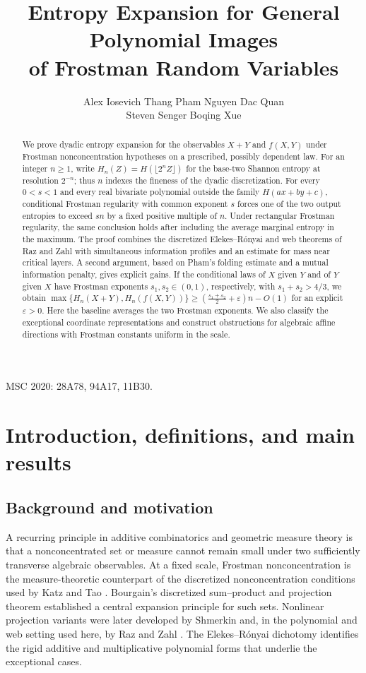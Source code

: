 \documentclass[11pt]{article}
\title{Entropy Expansion for General Polynomial Images\\
of Frostman Random Variables}
\author{Alex Iosevich \quad Thang Pham \quad Nguyen Dac Quan\\[0.5ex]
Steven Senger \quad Boqing Xue}
\date{}
\begin{document}
\maketitle

\begin{abstract}
We prove dyadic entropy expansion for the observables \(X+Y\) and
\(f(X,Y)\) under Frostman nonconcentration hypotheses on a prescribed,
possibly dependent law.  For an integer \(n\ge1\), write
\(H_n(Z)=H(\lfloor 2^nZ\rfloor)\) for the base-two Shannon entropy
at resolution \(2^{-n}\); thus \(n\) indexes the fineness of the
dyadic discretization.  For every \(0<s<1\) and every real bivariate
polynomial outside the family \(H(ax+by+c)\), conditional Frostman
regularity with common exponent \(s\) forces one of the two output entropies to exceed \(sn\) by
a fixed positive multiple of \(n\).  Under rectangular Frostman
regularity, the same conclusion holds after including the average
marginal entropy in the maximum.  The proof combines the discretized
Elekes--R\'onyai and web theorems of Raz and Zahl with simultaneous
information profiles and an estimate for mass near critical layers.
A second argument, based on Pham's folding estimate and a mutual
information penalty, gives explicit gains.  If the conditional laws
of \(X\) given \(Y\) and of \(Y\) given \(X\) have Frostman
exponents \(s_1,s_2\in(0,1)\), respectively, with
\(s_1+s_2>4/3\), we obtain
\(\max\{H_n(X+Y),H_n(f(X,Y))\}\ge
(\frac{s_1+s_2}{2}+\varepsilon)n-O(1)\)
for an explicit \(\varepsilon>0\).  Here the baseline averages the
two Frostman exponents.  We also classify the exceptional
coordinate representations and construct obstructions for algebraic
affine directions with Frostman constants uniform in the scale.
\end{abstract}

\noindent MSC 2020: 28A78, 94A17, 11B30.

\tableofcontents

\section{Introduction, definitions, and main results}
\label{sec:main}

\subsection{Background and motivation}

A recurring principle in additive combinatorics and geometric measure
theory is that a nonconcentrated set or measure cannot remain small
under two sufficiently transverse algebraic observables.  At a fixed
scale, Frostman nonconcentration is the measure-theoretic counterpart
of the discretized nonconcentration conditions used by Katz and Tao
\cite{KatzTao}.  Bourgain's discretized sum--product and projection
theorem \cite{BourgainProjection} established a central expansion
principle for such sets.  Nonlinear projection variants were later
developed by Shmerkin \cite{ShmerkinNonlinear} and, in the
polynomial and web setting used here, by Raz and Zahl \cite{RZ}.
The Elekes--R\'onyai dichotomy \cite{ER} identifies the rigid
additive and multiplicative polynomial forms that underlie the
exceptional cases.
\end{document}

